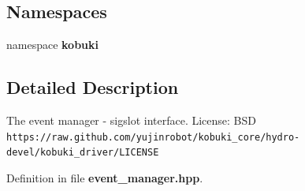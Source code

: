 \subsection*{\-Namespaces}
\begin{DoxyCompactItemize}
\item 
namespace {\bf kobuki}
\end{DoxyCompactItemize}


\subsection{\-Detailed \-Description}
\-The event manager -\/ sigslot interface. \-License\-: \-B\-S\-D {\tt https\-://raw.\-github.\-com/yujinrobot/kobuki\-\_\-core/hydro-\/devel/kobuki\-\_\-driver/\-L\-I\-C\-E\-N\-S\-E} 

\-Definition in file {\bf event\-\_\-manager.\-hpp}.

